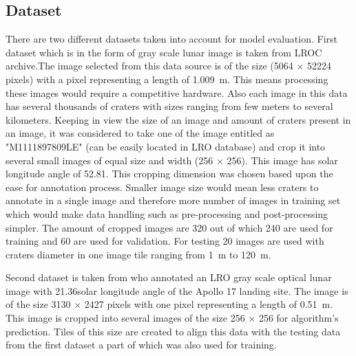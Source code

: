 \documentclass[11pt]{article}
\begin{document}
\subsection{Dataset}
There are two different datasets taken into account for model evaluation. First dataset which is in the form of gray scale lunar image is taken from LROC archive.The image selected from this data source is of the size (5064 $\times$ 52224 pixels) with a pixel representing a length of \SI{1.009}{m}. This means processing these images would require a competitive hardware. Also each image in this data has several thousands of craters with sizes ranging from few meters to several kilometers. Keeping in view the size of an image and amount of craters present in an image, it was considered to take one of the image entitled as "M1111897809LE" (can be easily located in LRO database) and crop it into several small images of equal size and width (256 $\times$ 256). This image has solar longitude angle of 52.81\textdegree. This cropping dimension was chosen based upon the ease for annotation process. Smaller image size would mean less craters to annotate in a single image and therefore more number of images in training set which would make data handling such as pre-processing and post-processing simpler. The amount of cropped images are 320 out of which 240 are used for training and 60 are used for validation. For testing 20 images are used with craters diameter in one image tile ranging from \SI{1}{m} to \SI{120}{m}. 

Second dataset is taken from \cite{dino2020} who annotated an LRO gray scale optical lunar image with 21.36\textdegree solar longitude angle of the Apollo 17 landing site. The image is of the size 3130 $\times$ 2427 pixels with one pixel representing a length of \SI{0.51}{m}. This image is cropped into several images of the size 256 $\times$ 256 for algorithm's prediction. Tiles of this size are created to align this data with the testing data from the first dataset a part of which was also used for training.

\end{document}
